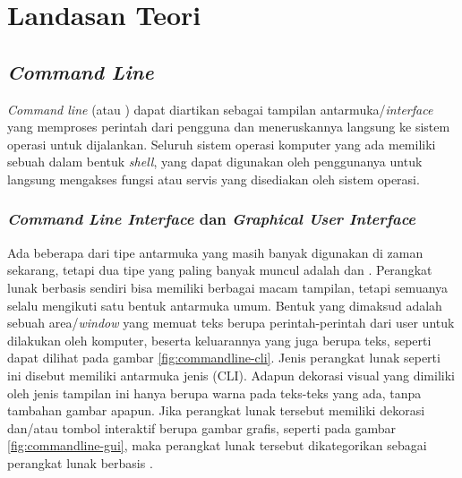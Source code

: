 \chapter{Landasan Teori}
\label{chap:teori}

\section{\textit{Command Line}}
\label{sec:commandline}
\textit{Command line} (atau \cli) dapat diartikan sebagai tampilan antarmuka/\textit{interface} yang memproses perintah dari pengguna dan meneruskannya langsung ke sistem operasi untuk dijalankan.\cite{shottsjr:2019:linuxcommandline} Seluruh sistem operasi komputer yang ada memiliki sebuah \cli dalam bentuk \textit{shell}, yang dapat digunakan oleh penggunanya untuk langsung mengakses fungsi atau servis yang disediakan oleh sistem operasi.\cite{mueller:2007:windowscommandline} 


\subsection{\textit{Command Line Interface} dan \textit{Graphical User Interface}}
\label{sec:commandline-comparison}

Ada beberapa dari tipe antarmuka yang masih banyak digunakan di zaman sekarang, tetapi dua tipe yang paling banyak muncul adalah \cli dan \gui. Perangkat lunak berbasis \cl sendiri bisa memiliki berbagai macam tampilan, tetapi semuanya selalu mengikuti satu bentuk antarmuka umum. Bentuk yang dimaksud adalah sebuah area/\textit{window} yang memuat teks berupa perintah-perintah dari user untuk dilakukan oleh komputer, beserta keluarannya yang juga berupa teks, seperti dapat dilihat pada gambar \ref{fig:commandline-cli}. Jenis perangkat lunak seperti ini disebut memiliki antarmuka jenis \cli (CLI). Adapun dekorasi visual yang dimiliki oleh jenis tampilan ini hanya berupa warna pada teks-teks yang ada, tanpa tambahan gambar apapun. Jika perangkat lunak tersebut memiliki dekorasi dan/atau tombol interaktif berupa gambar grafis, seperti pada gambar \ref{fig:commandline-gui}, maka perangkat lunak tersebut dikategorikan sebagai perangkat lunak berbasis \gui.

